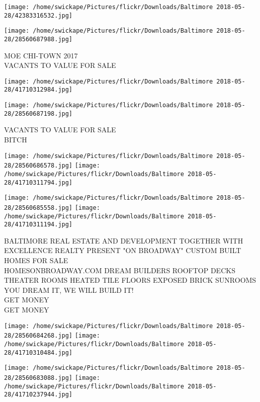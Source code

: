 \documentclass[10pt,letterpaper]{article}
\begin{document}
\texttt{[image: /home/swickape/Pictures/flickr/Downloads/Baltimore 2018-05-28/42383316532.jpg]}

\vspace{0.25in}
\texttt{[image: /home/swickape/Pictures/flickr/Downloads/Baltimore 2018-05-28/28560687988.jpg]}

MOE CHI{-}TOWN 2017\\
VACANTS TO VALUE FOR SALE\\
\pagebreak

\texttt{[image: /home/swickape/Pictures/flickr/Downloads/Baltimore 2018-05-28/41710312984.jpg]}

\vspace{0.25in}
\texttt{[image: /home/swickape/Pictures/flickr/Downloads/Baltimore 2018-05-28/28560687198.jpg]}

VACANTS TO VALUE FOR SALE\\
BITCH\\
\pagebreak

\texttt{[image: /home/swickape/Pictures/flickr/Downloads/Baltimore 2018-05-28/28560686578.jpg]}
\texttt{[image: /home/swickape/Pictures/flickr/Downloads/Baltimore 2018-05-28/41710311794.jpg]}

\texttt{[image: /home/swickape/Pictures/flickr/Downloads/Baltimore 2018-05-28/28560685558.jpg]}
\texttt{[image: /home/swickape/Pictures/flickr/Downloads/Baltimore 2018-05-28/41710311194.jpg]}

BALTIMORE REAL ESTATE AND DEVELOPMENT TOGETHER WITH EXCELLENCE REALTY PRESENT "ON BROADWAY" CUSTOM BUILT HOMES FOR SALE\\
HOMESONBROADWAY.COM DREAM BUILDERS ROOFTOP DECKS THEATER ROOMS HEATED TILE FLOORS EXPOSED BRICK SUNROOMS YOU DREAM IT, WE WILL BUILD IT!\\
GET MONEY\\
GET MONEY\\
\pagebreak

\texttt{[image: /home/swickape/Pictures/flickr/Downloads/Baltimore 2018-05-28/28560684268.jpg]}
\texttt{[image: /home/swickape/Pictures/flickr/Downloads/Baltimore 2018-05-28/41710310484.jpg]}

\texttt{[image: /home/swickape/Pictures/flickr/Downloads/Baltimore 2018-05-28/28560683088.jpg]}
\texttt{[image: /home/swickape/Pictures/flickr/Downloads/Baltimore 2018-05-28/41710237944.jpg]}
\end{document}
